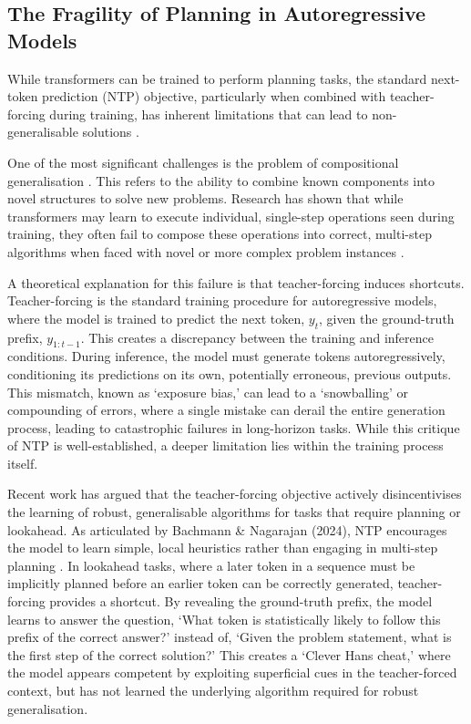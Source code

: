 \subsection{The Fragility of Planning in Autoregressive Models}

While transformers can be trained to perform planning tasks, the standard next-token prediction (NTP) objective, particularly when combined with teacher-forcing during training, has inherent limitations that can lead to non-generalisable solutions \cite{bachmann2024ntp}.

One of the most significant challenges is the problem of compositional generalisation \citep{montaguecompositionality}. This refers to the ability to combine known components into novel structures to solve new problems. Research has shown that while transformers may learn to execute individual, single-step operations seen during training, they often fail to compose these operations into correct, multi-step algorithms when faced with novel or more complex problem instances \cite{lake2018generalizationsystematicitycompositionalskills, zhou2023leasttomostpromptingenablescomplex, dziri2023faithfatelimitstransformers}.

A theoretical explanation for this failure is that teacher-forcing induces shortcuts. Teacher-forcing is the standard training procedure for autoregressive models, where the model is trained to predict the next token, $y_t$, given the ground-truth prefix, $y_{1:t-1}$. This creates a discrepancy between the training and inference conditions. During inference, the model must generate tokens autoregressively, conditioning its predictions on its own, potentially erroneous, previous outputs. This mismatch, known as `exposure bias,' can lead to a `snowballing' or compounding of errors, where a single mistake can derail the entire generation process, leading to catastrophic failures in long-horizon tasks. While this critique of NTP is well-established, a deeper limitation lies within the training process itself. 

Recent work has argued that the teacher-forcing objective actively disincentivises the learning of robust, generalisable algorithms for tasks that require planning or lookahead. As articulated by Bachmann \& Nagarajan (2024), NTP encourages the model to learn simple, local heuristics rather than engaging in multi-step planning \cite{bachmann2024ntp}. In lookahead tasks, where a later token in a sequence must be implicitly planned before an earlier token can be correctly generated, teacher-forcing provides a shortcut. By revealing the ground-truth prefix, the model learns to answer the question, `What token is statistically likely to follow this prefix of the correct answer?' instead of, `Given the problem statement, what is the first step of the correct solution?' This creates a `Clever Hans cheat,' where the model appears competent by exploiting superficial cues in the teacher-forced context, but has not learned the underlying algorithm required for robust generalisation. 

